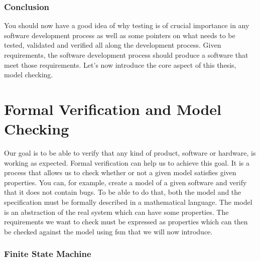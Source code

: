 \documentclass[12pt]{article}
\theoremstyle{definition}
\theoremstyle{definition}
\theoremstyle{remark}
\begin{document}
\section{Conclusion}


You should now have a good idea of why testing is of crucial importance in any software development process as well as some pointers on what needs to be tested, validated and verified all along the development process. Given requirements, the software development process should produce a software that meet those requirements. Let's now introduce the core aspect of this thesis, model checking.



\clearpage
\part{Formal Verification and Model Checking}\label{ModelChecking}

Our goal is to be able to verify that any kind of product, software or hardware, is working as expected. Formal verification can help us to achieve this goal. It is a process that allows us to check whether or not a given model satisfies given properties. You can, for example, create a model of a given software and verify that it does not contain bugs. To be able to do that, both the model and the specification must be formally described in a mathematical language. The model is an abstraction of the real system which can have some properties. The requirements we want to check must be expressed as properties which can then be checked against the model using \gls{fsm} that we will now introduce.\\


\clearpage



\section{Finite State Machine}
\end{document}
